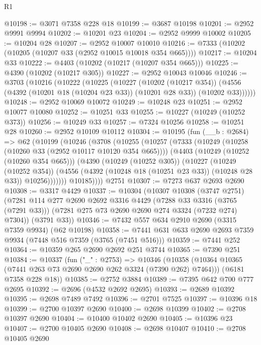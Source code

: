 \begin{lexlean}{R1}
\begin{coremodule}
@10198 := @3071 @7358 @228 @18
@10199 := @3687 @10198
@10201 := @2952 @9991 @9994
@10202 := @10201 @23
@10204 := @2952 @9999 @10002
@10205 := @10204 @28
@10207 := @2952 @10007 @10010
@10216 := @7333 (@10202 (@10205 (@10207 @33 (@2952 @10015 @10018 @354 @665))))
@10217 := @10204 @33
@10222 := @4403 (@10202 (@10217 (@10207 @354 @665)))
@10225 := @4390 (@10202 (@10217 @305))
@10227 := @2952 @10043 @10046
@10246 := @3703
    (@10216
      (@10222
        (@10225
          (@10227
            (@10202 (@10217 @354))
            (@4556 (@4392 (@10201 @18 (@10204 @23 @33)) (@10201 @28 @33)) (@10202 @33))))))
@10248 := @2952 @10069 @10072
@10249 := @10248 @23
@10251 := @2952 @10077 @10080
@10252 := @10251 @33
@10255 := @10227 (@10249 (@10252 @373))
@10256 := @10249 @33
@10257 := @7324 @10256
@10258 := @10251 @28
@10260 := @2952 @10109 @10112
@10304 := @10195
    (fun (__b : @2684) =>
    @62
      (@10199
        (@10246
          (@3708
            (@10255
              (@10257
                (@7333
                  (@10249 (@10258 (@10260 @33 (@2952 @10117 @10120 @354 @665))))
                  (@4403
                    (@10249 (@10252 (@10260 @354 @665)))
                    (@4390
                      (@10249 (@10252 @305))
                      (@10227
                        (@10249 (@10252 @354))
                        (@4556 (@4392 (@10248 @18 (@10251 @23 @33)) (@10248 @28 @33)) @10256)))))))
            @10185))))
    @2751
@10307 := @7273 @637 @2693 @2690
@10308 := @3317 @4429
@10337 := @10304
    (@10307
      @10308
      (@3747 @2751)
      (@7281
        @114
        @277
        @2690
        @2692
        @3316
        @4429
        (@7288 @33 @3316 (@3765 (@7291 @33)))
        (@7281 @275 @73 @2690 @2690 @274 @3324 (@7232 @274) @7304))
      (@3791 @33))
@10346 := @7432 @557 @634 @2910 @2690 (@3315 @7359 @9934) (@62 @10198)
@10358 := @7441 @631 @633 @2690 @2693 @7359 @9934 (@7448 @516 @7359 (@3765 (@7451 @516)))
@10359 := @7441 @252
@10364 := @10359 @265 @2690 @2692 @251 @3744
@10365 := @7390 @251
@10384 := @10337
    (fun ("_" : @2753) =>
    @10346
      (@10358 (@10364 @10365 (@7441 @263 @73 @2690 @2690 @262 @3324 (@7390 @262) @7464)))
      (@6181 @7358 @228 @18))
@10385 := @2752 @3884
@10389 := @7395 @642 @700 @777 @2695
@10392 := @2696 (@4532 @2692 @2695)
@10393 := @2689 @10392
@10395 := @2698 @7489 @7492
@10396 := @2701 @7525
@10397 := @10396 @18
@10399 := @2700 @10397 @2690
@10400 := @2698 @10399
@10402 := @2708 @10397 @2690
@10404 := @10400 @10402 @2690
@10405 := @10396 @23
@10407 := @2700 @10405 @2690
@10408 := @2698 @10407
@10410 := @2708 @10405 @2690

\end{coremodule}
\end{lexlean}
